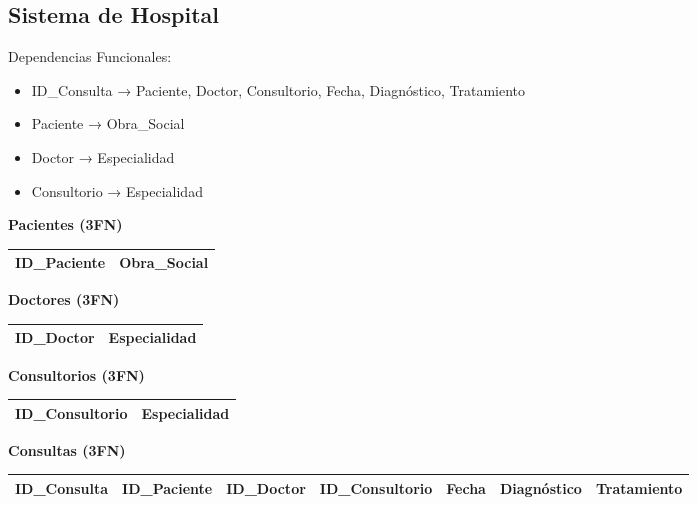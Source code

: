 \documentclass[12pt]{article}
\begin{document}
\subsection{Sistema de Hospital}

Dependencias Funcionales:
\begin{itemize}
    \item ID\_Consulta → Paciente, Doctor, Consultorio, Fecha, Diagnóstico, Tratamiento
    \item Paciente → Obra\_Social
    \item Doctor → Especialidad
    \item Consultorio → Especialidad
\end{itemize}

\textbf{Pacientes (3FN)}
\begin{center}
\begin{tabular}{|l|l|}
\hline
ID\_Paciente & Obra\_Social \\
\hline
\end{tabular}
\end{center}

\textbf{Doctores (3FN)}
\begin{center}
\begin{tabular}{|l|l|}
\hline
ID\_Doctor & Especialidad \\
\hline
\end{tabular}
\end{center}

\textbf{Consultorios (3FN)}
\begin{center}
\begin{tabular}{|l|l|}
\hline
ID\_Consultorio & Especialidad \\
\hline
\end{tabular}
\end{center}

\textbf{Consultas (3FN)}
{\small
\begin{center}
\begin{tabular}{|l|l|l|l|l|l|l|}
\hline
ID\_Consulta & ID\_Paciente & ID\_Doctor & ID\_Consultorio & Fecha & Diagnóstico & Tratamiento \\
\hline
\end{tabular}
\end{center}
}
\end{document}

